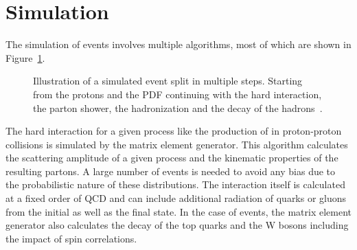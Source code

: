 \section{Simulation}
\label{sec:SimReco_Sim}

The simulation of events involves multiple algorithms, most of which are shown in Figure~\ref{fig:sim_struct}.

\begin{figure}[htbp!]
  \begin{center}
\caption{Illustration of a simulated event split in multiple steps. Starting from the protons and the PDF continuing with the hard interaction, the parton shower, the hadronization and the decay of the hadrons~\cite{Dobbs:684090}.
  \label{fig:sim_struct}}
  \end{center}
\end{figure}

The hard interaction for a given process like the production of \ttbar in proton-proton collisions is simulated by the matrix element generator.
This algorithm calculates the scattering amplitude of a given process and the kinematic properties of the resulting partons.
A large number of events is needed to avoid any bias due to the probabilistic nature of these distributions.
The interaction itself is calculated at a fixed order of QCD and can include additional radiation of quarks or gluons from the initial as well as the final state.
In the case of \ttbar events, the matrix element generator also calculates the decay of the top quarks and the W bosons including the impact of spin correlations.

